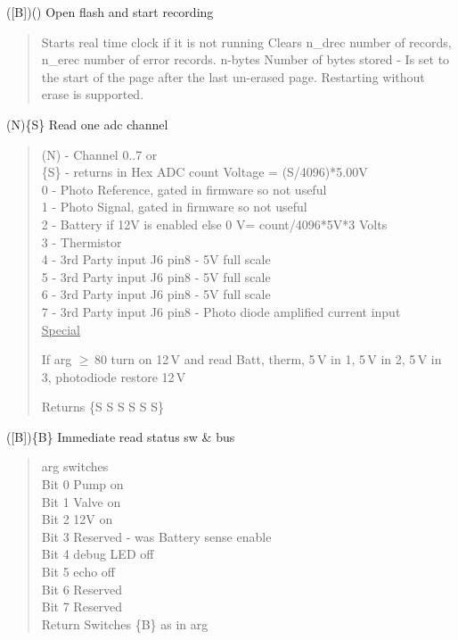 { ({[}B{]})() Open flash and start recording}
\begin{quote}
	Starts real time clock if it is not running
	Clears n\_drec number of records, n\_erec number of error records.
	n-bytes Number of bytes stored - Is set to the start of the page after
	the last un-erased page.
	Restarting without erase is supported.\\
\end{quote}

{ (N)\{S\} Read one adc channel}
\begin{quote}
	(N) - Channel 0..7 or\\
	\{S\} - returns in Hex ADC count Voltage = (S/4096)*5.00V\\
	0 - Photo Reference, gated in firmware so not useful\\
	1 - Photo Signal, gated in firmware so not useful\\
	2 - Battery if 12V is enabled else 0 V= count/4096*5V*3 Volts\\
	3 - Thermistor\\
	4 - 3rd Party input J6 pin8 - 5V full scale\\
	5 - 3rd Party input J6 pin8 - 5V full scale\\
	6 - 3rd Party input J6 pin8 - 5V full scale\\
	7 - 3rd Party input J6 pin8 - Photo diode amplified current input\\
	
	\underline{Special}
	
	If arg $\geq$\,80 turn on 12\,V and read Batt, therm, 5\,V in 1, 5\,V
	in 2, 5\,V in 3, photodiode restore 12\,V
	
	Returns \{S S S S S S\}\\
\end{quote}

{ ({[}B{]})\{B\} Immediate read status sw \& bus}
\begin{quote}
	arg switches\\
	Bit 0 Pump on\\
	Bit 1 Valve on\\
	Bit 2 12V on\\
	Bit 3 Reserved - was Battery sense enable\\
	Bit 4 debug LED off\\
	Bit 5 echo off\\
	Bit 6 Reserved\\
	Bit 7 Reserved\\
	Return Switches \{B\} as in arg\\
\end{quote}

